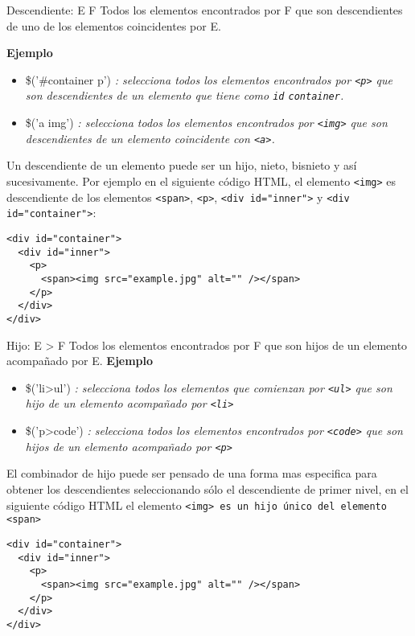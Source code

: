 \begin{frame}[fragile]{Descendiente: E F} %
Todos los elementos encontrados por F que son descendientes de uno de los
elementos coincidentes por E.

\textbf{Ejemplo}
\begin{itemize}
    \item \$('\#container p') \textit{: selecciona todos los elementos
    encontrados por \texttt{<p>} que son descendientes de un elemento que tiene
    como \texttt{id} \texttt{container}.}
    \item \$('a img') \textit{: selecciona todos los elementos encontrados por
    \texttt{<img>} que son descendientes de un elemento coincidente con
    \texttt{<a>}.}
\end{itemize}
Un descendiente de un elemento puede ser un hijo, nieto,  bisnieto y así
sucesivamente. Por ejemplo en el siguiente código HTML,  el elemento
\texttt{<img>} es
descendiente de los elementos \texttt{<span>}, \texttt{<p>},  \texttt{<div
id="\/inner"\/>} y
\texttt{<div id="\/container"\/>}:

\begin{lstlisting}
<div id="container">
  <div id="inner">
    <p>
      <span><img src="example.jpg" alt="" /></span>
    </p>
  </div>
</div>
\end{lstlisting}
\end{frame}


\begin{frame}[fragile]{Hijo: E > F} %
Todos los elementos encontrados por F que son hijos de un elemento acompañado
por E.
\textbf{Ejemplo}
\begin{itemize}
    \item \$('li>ul') \textit{: selecciona todos los elementos que comienzan
    por \texttt{<ul>} que son hijo de un elemento acompañado por \texttt{<li>}}
    \item \$('p>code') \textit{: selecciona todos los elementos encontrados por
    \texttt{<code>} que son hijos de un elemento acompañado por \texttt{<p>}}
\end{itemize}
El combinador de hijo puede ser pensado de una forma mas especifica para
obtener los descendientes seleccionando sólo el descendiente de primer nivel,
en el siguiente código HTML el elemento \texttt{<img> es un hijo único del
elemento \texttt{<span>}}
\begin{lstlisting}
<div id="container">
  <div id="inner">
    <p>
      <span><img src="example.jpg" alt="" /></span>
    </p>
  </div>
</div>
\end{lstlisting}
\end{frame}

